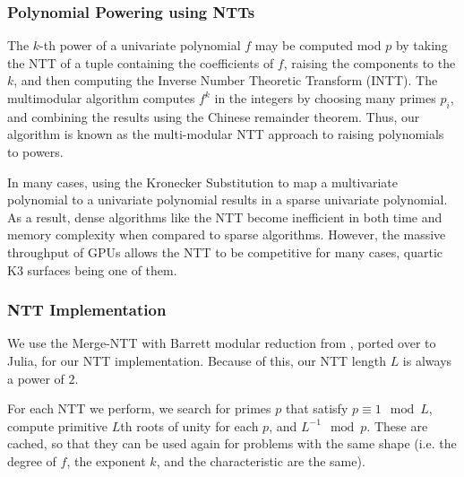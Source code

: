 \subsubsection{Polynomial Powering using NTTs}
The \(k\)-th power of a univariate polynomial \(f\)
may be computed mod \(p\) by taking the NTT 
of a tuple containing the coefficients of \(f\),
raising the components to the \(k\),
and then computing the Inverse Number Theoretic Transform (INTT).
The multimodular algorithm 
computes \(f^{k}\) in the integers by
choosing many primes \(p_{i}\), 
and combining the results using the Chinese remainder theorem.
Thus, our algorithm is known as the 
multi-modular NTT approach to raising polynomials to powers.

In many cases, using the Kronecker Substitution to 
map a multivariate polynomial to a univariate polynomial results in 
a sparse univariate polynomial. As a result, dense 
algorithms like the NTT become inefficient in both 
time and memory complexity when compared to sparse algorithms.
However, the massive throughput of GPUs allows the 
NTT to be competitive for many cases, 
quartic K3 surfaces being one of them.

\subsubsection{NTT Implementation}

We use the Merge-NTT with Barrett modular reduction from \cite{ozcan-2023-fft}, ported over to Julia, for our NTT implementation. 
Because of this, our NTT length $L$ is always a power of $2$. 

For each NTT we perform, we search for primes $p$ that satisfy 
$p \equiv 1 \mod L$, compute primitive $L$th roots of unity 
for each $p$, and $L^{-1} \mod p$. 
These are cached, so that they can be used again for problems with the same shape 
(i.e. the degree of \(f\), the exponent \(k\), and the characteristic are the same).


